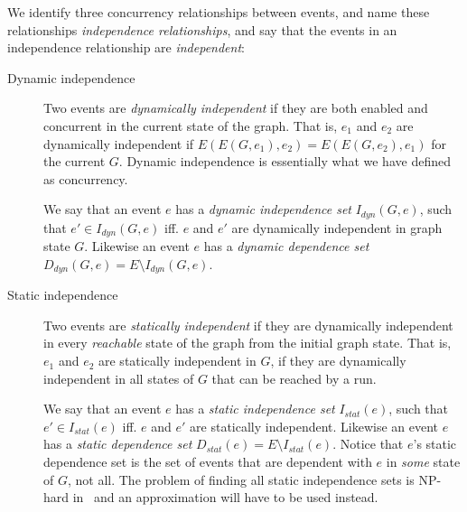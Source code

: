 \documentclass{article}
\begin{document}
			We identify three concurrency relationships between events, and name these relationships \textit{independence relationships}, and say that the events in an independence relationship are \textit{independent}:
			\begin{description}
				\item[Dynamic independence] Two events are \textit{dynamically independent} if they are both enabled and concurrent in the current state of the graph.
				That is, $e_1$ and $e_2$ are dynamically independent if $E(E(G, e_1),e_2)=E(E(G, e_2),e_1)$ for the current $G$.
				Dynamic independence is essentially what we have defined as concurrency.

				We say that an event $e$ has a \textit{dynamic independence set} $I_{dyn}(G,e)$, such that $e' \in I_{dyn}(G,e)$ iff. $e$ and $e'$ are dynamically independent in graph state $G$.
				Likewise an event $e$ has a \textit{dynamic dependence set} $D_{dyn}(G,e) = E \setminus I_{dyn}(G,e)$.

				\item[Static independence] Two events are \textit{statically independent} if they are dynamically independent in every \textit{reachable} state of the graph from the initial graph state.
				That is, $e_1$ and $e_2$ are statically independent in $G$, if they are dynamically independent in all states of $G$ that can be reached by a run.

				We say that an event $e$ has a \textit{static independence set} $I_{stat}(e)$, such that $e' \in I_{stat}(e)$ iff. $e$ and $e'$ are statically independent.
				Likewise an event $e$ has a \textit{static dependence set} $D_{stat}(e) = E \setminus I_{stat}(e)$.
				Notice that $e$'s static dependence set is the set of events that are dependent with $e$ in \textit{some} state of $G$, not all.
				The problem of finding all static independence sets is NP-hard in~\cite{debois_replication_2017-1} and an approximation will have to be used instead.
			\end{description}
\end{document}
